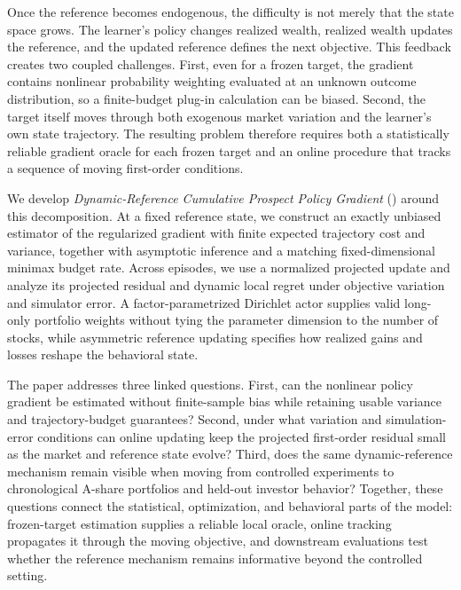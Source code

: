Once the reference becomes endogenous, the difficulty is not merely that the state space grows.  The learner's policy changes realized wealth, realized wealth updates the reference, and the updated reference defines the next \CPT objective.  This feedback creates two coupled challenges.  First, even for a frozen target, the \CPT gradient contains nonlinear probability weighting evaluated at an unknown outcome distribution, so a finite-budget plug-in calculation can be biased.  Second, the target itself moves through both exogenous market variation and the learner's own state trajectory.  The resulting problem therefore requires both a statistically reliable gradient oracle for each frozen target and an online procedure that tracks a sequence of moving first-order conditions.

We develop \emph{Dynamic-Reference Cumulative Prospect Policy Gradient} (\DRCPTPG) around this decomposition.  At a fixed reference state, we construct an exactly unbiased estimator of the regularized \CPT gradient with finite expected trajectory cost and variance, together with asymptotic inference and a matching fixed-dimensional minimax budget rate.  Across episodes, we use a normalized projected update and analyze its projected residual and dynamic local regret under objective variation and simulator error.  A factor-parametrized Dirichlet actor supplies valid long-only portfolio weights without tying the parameter dimension to the number of stocks, while asymmetric reference updating specifies how realized gains and losses reshape the behavioral state.

The paper addresses three linked questions.  First, can the nonlinear \CPT policy gradient be estimated without finite-sample bias while retaining usable variance and trajectory-budget guarantees?  Second, under what variation and simulation-error conditions can online updating keep the projected first-order residual small as the market and reference state evolve?  Third, does the same dynamic-reference mechanism remain visible when moving from controlled experiments to chronological A-share portfolios and held-out investor behavior?  Together, these questions connect the statistical, optimization, and behavioral parts of the model: frozen-target estimation supplies a reliable local oracle, online tracking propagates it through the moving objective, and downstream evaluations test whether the reference mechanism remains informative beyond the controlled setting.


